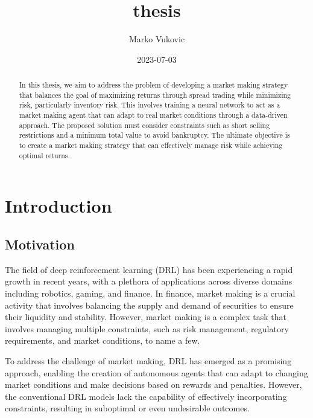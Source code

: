 \documentclass[
  12pt,
  a4paper,
  DIV=11,
  numbers=noendperiod]{scrartcl}
\title{thesis}
\author{Marko Vukovic}
\date{2023-07-03}
\renewcommand*\contentsname{Table of contents}
\newcommand\contentsname{Table of contents}
\begin{document}
\maketitle
\begin{abstract}
In this thesis, we aim to address the problem of developing a market
making strategy that balances the goal of maximizing returns through
spread trading while minimizing risk, particularly inventory risk. This
involves training a neural network to act as a market making agent that
can adapt to real market conditions through a data-driven approach. The
proposed solution must consider constraints such as short selling
restrictions and a minimum total value to avoid bankruptcy. The ultimate
objective is to create a market making strategy that can effectively
manage risk while achieving optimal returns.
\end{abstract}
\ifdefined\Shaded\renewenvironment{Shaded}{\begin{tcolorbox}[interior hidden, boxrule=0pt, enhanced, borderline west={3pt}{0pt}{shadecolor}, sharp corners, breakable, frame hidden]}{\end{tcolorbox}}\fi

\renewcommand*\contentsname{Table of contents}
{
\hypersetup{linkcolor=}
\setcounter{tocdepth}{3}
\tableofcontents
}
\hypertarget{introduction}{%
\section{Introduction}\label{introduction}}

\hypertarget{motivation}{%
\subsection{Motivation}\label{motivation}}

The field of deep reinforcement learning (DRL) has been experiencing a
rapid growth in recent years, with a plethora of applications across
diverse domains including robotics, gaming, and finance. In finance,
market making is a crucial activity that involves balancing the supply
and demand of securities to ensure their liquidity and stability.
However, market making is a complex task that involves managing multiple
constraints, such as risk management, regulatory requirements, and
market conditions, to name a few.

To address the challenge of market making, DRL has emerged as a
promising approach, enabling the creation of autonomous agents that can
adapt to changing market conditions and make decisions based on rewards
and penalties. However, the conventional DRL models lack the capability
of effectively incorporating constraints, resulting in suboptimal or
even undesirable outcomes.
\end{document}
